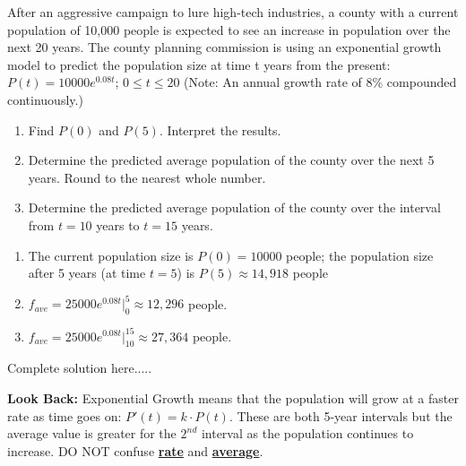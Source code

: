 \begin{example}
After an aggressive campaign to lure high-tech industries, a county with a current population of 10,000 people is expected to see an increase in population over the next 20 years.  The county planning commission is using an exponential growth model to predict the population size at time t years from the present: $P(t)=10000e^{0.08t}$; $0\le t \le 20$ (Note:  An annual growth rate of 8\% compounded continuously.) 
\renewcommand{\labelenumi}{\textbf{(\alph{enumi})}}
    \begin{enumerate}[leftmargin=*]
    \item Find $P(0)$ and $P(5)$. Interpret the results.
    \item Determine the predicted average population of the county over the next 5 years. Round to the nearest whole number.
    
    \item 	Determine the predicted average population of the county over the interval from $t=10$ years to $t=15$ years. 
    \end{enumerate}
    \begin{sol}
    \renewcommand{\labelenumi}{\textbf{(\alph{enumi})}}
    \begin{enumerate}[leftmargin=*]
    \item The current population size is $P(0)=10000$ people; the population size after 5 years (at time $t=5$) is $P(5)\approx 14,918$ people
    \item $f_{ave}=25000e^{0.08t}\Big|_0^5\approx 12,296$ people.
    \item $f_{ave}=25000e^{0.08t}\Big|_{10}^{15}\approx 27,364$ people.
    \end{enumerate}
    \end{sol}
    \begin{solL}
    Complete solution here.....
    
    \end{solL}
    
\end{example}
\newpage
\noindent \textbf{Look Back:} Exponential Growth means that the population will grow at a faster rate as time goes on: $P'(t)=k\cdot P(t)$. These are both 5-year intervals but the average value is greater for the $2^{nd}$ interval as the population continues to increase. DO NOT confuse \underline{\textbf{rate}} and \underline{\textbf{average}}.\\

